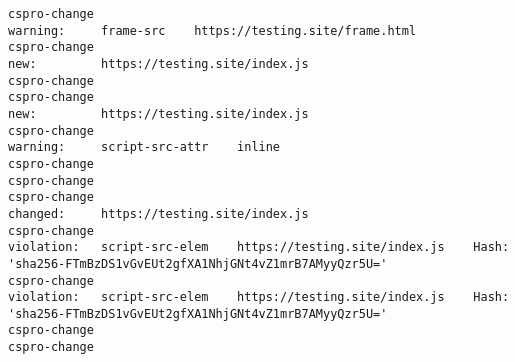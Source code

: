 \begin{verbatim}
cspro-change
warning:     frame-src    https://testing.site/frame.html
cspro-change
new:         https://testing.site/index.js
cspro-change
cspro-change
new:         https://testing.site/index.js
cspro-change
warning:     script-src-attr    inline
cspro-change
cspro-change
cspro-change
changed:     https://testing.site/index.js
cspro-change
violation:   script-src-elem    https://testing.site/index.js    Hash: 'sha256-FTmBzDS1vGvEUt2gfXA1NhjGNt4vZ1mrB7AMyyQzr5U='
cspro-change
violation:   script-src-elem    https://testing.site/index.js    Hash: 'sha256-FTmBzDS1vGvEUt2gfXA1NhjGNt4vZ1mrB7AMyyQzr5U='
cspro-change
cspro-change
\end{verbatim}

